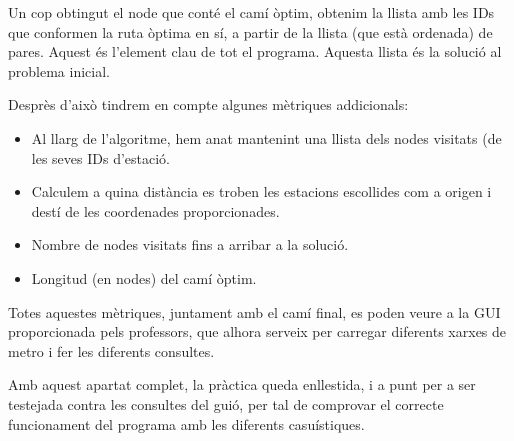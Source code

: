 \documentclass[a4paper,12pt]{article}
\begin{document}
        Un cop obtingut el node que conté el camí òptim, obtenim la llista amb les IDs que conformen la ruta òptima en sí, a partir de la llista (que està ordenada) de pares. Aquest és l’element clau de tot el programa. Aquesta llista és la solució al problema inicial.

        Desprès d'això tindrem en compte algunes mètriques addicionals:
        \begin{itemize}
            \item Al llarg de l’algoritme, hem anat mantenint una llista dels nodes visitats (de les seves IDs d’estació.
            \item Calculem a quina distància es troben les estacions escollides com a origen i destí de les coordenades proporcionades.
            \item Nombre de nodes visitats fins a arribar a la solució.
            \item Longitud (en nodes) del camí òptim.
        \end{itemize}
        
        Totes aquestes mètriques, juntament amb el camí final, es poden veure a la GUI proporcionada pels professors, que alhora serveix per carregar diferents xarxes de metro i fer les diferents consultes.


        Amb aquest apartat complet, la pràctica queda enllestida, i a punt per a ser testejada contra les consultes del guió, per tal de comprovar el correcte funcionament del programa amb les diferents casuístiques.

        
                
\end{document}

